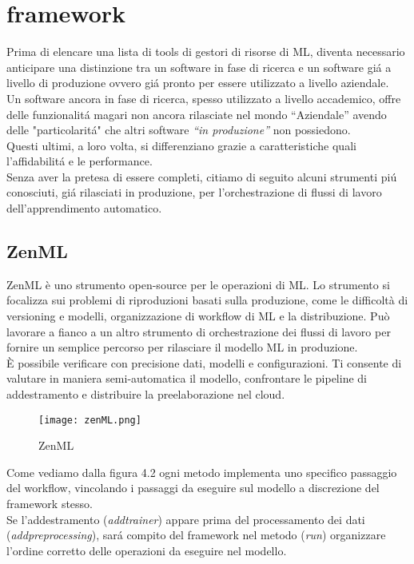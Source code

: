 \documentclass[../tesi.tex]{subfiles}
\begin{document}
\section{\Gls{framework}}
  Prima di elencare una lista di tools di gestori di risorse di ML, diventa necessario anticipare una distinzione tra un software in fase di ricerca e un software giá a livello di produzione ovvero giá pronto per essere utilizzato a livello aziendale.\\
  Un software ancora in fase di ricerca, spesso utilizzato a livello accademico, offre delle funzionalitá magari non ancora rilasciate nel mondo ``Aziendale'' avendo delle "particolaritá" che altri software \textit{``in produzione''} non possiedono.\\
  Questi ultimi, a loro volta, si differenziano grazie a caratteristiche quali l'affidabilitá e le performance.\\
  Senza aver la pretesa di essere completi, citiamo di seguito alcuni strumenti  piú conosciuti, giá rilasciati in produzione, per l'orchestrazione di flussi di lavoro dell'apprendimento automatico.

  \newpage
  \subsection{ZenML} 
  ZenML è uno strumento open-source per le operazioni di ML.
  Lo strumento si focalizza sui problemi di riproduzioni basati sulla produzione, come le difficoltà di versioning e modelli, organizzazione di workflow di ML e la distribuzione. Può lavorare a fianco a un altro strumento di orchestrazione dei flussi di lavoro per fornire un semplice percorso per rilasciare il modello ML in produzione.\\
  È possibile verificare con precisione dati, modelli e configurazioni. Ti consente di valutare in maniera semi-automatica il modello, confrontare le \Gls{pipeline} di addestramento e distribuire la preelaborazione nel cloud.\cite{zenmlframework}
  
\begin{figure}[htbp]
\centering
\texttt{[image: zenML.png]} 
\caption{ZenML}
\end{figure}
  Come vediamo dalla figura 4.2 ogni metodo implementa uno specifico passaggio del workflow, vincolando i passaggi da eseguire sul modello a discrezione del \Gls{framework} stesso.\\
  Se l'addestramento (\textit{add\textunderscore trainer}) appare prima del processamento dei dati (\textit{add\textunderscore preprocessing}), sará compito del framework nel metodo (\textit{run}) organizzare l'ordine corretto delle operazioni da eseguire nel modello.
  \newpage
\end{document}
